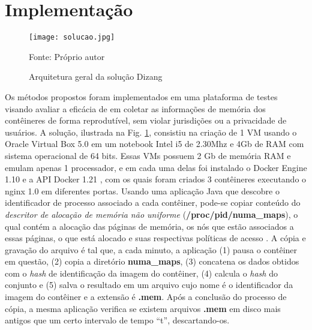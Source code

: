 \section{Implementação}
\label{sec:proposta-impl}


\begin{figure}[htb!]
\footnotesize
\caption{Arquitetura geral da solução Dizang}
\texttt{[image: solucao.jpg]}
\centering
\label{fig:Solucao}
\begin{center}
Fonte: Próprio autor 
\end{center}
\end{figure}


Os métodos propostos foram implementados em uma plataforma de testes visando avaliar a eficácia de \fancyname em coletar as informações de memória dos contêineres de forma reprodutível, sem violar jurisdições ou a privacidade de usuários.
%
A solução, ilustrada na Fig. \ref{fig:Solucao}, consistiu na criação de 1 VM usando o Oracle Virtual Box 5.0%
em um notebook Intel i5 de 2.30Mhz e 4Gb de RAM com sistema operacional de 64 bits.
%
Essas VMs possuem 2 Gb de memória RAM e emulam apenas 1 processador, e em cada uma delas foi instalado o Docker Engine 1.10%
e a API Docker 1.21%
, com os quais foram criados 3 contêineres executando o nginx 1.0%
 em diferentes portas. 
%
Usando uma aplicação Java que descobre o identificador de processo associado a cada contêiner, pode-se copiar conteúdo do \textit{descritor de alocação de memória não uniforme} (\textbf{/proc/pid/numa\_maps}), o qual contém a alocação das páginas de memória, os nós que estão associados a essas páginas, o que está alocado e suas respectivas políticas de acesso \cite{UnixManPagesNumaMaps}.
%
A cópia e gravação do arquivo é tal que, a cada minuto, a aplicação (1) pausa o contêiner em questão, (2) copia a diretório \textbf{numa\_maps}, (3)  concatena os dados obtidos com o \textit{hash} de identificação da imagem do contêiner, (4) calcula o \textit{hash} do conjunto e (5) salva o resultado em um arquivo cujo nome é o identificador da imagem do contêiner e a extensão é \textbf{.mem}. 
%
Após a conclusão do processo de cópia, a mesma aplicação verifica se existem arquivos \textbf{.mem} em disco mais antigos que um certo intervalo de tempo ``t'', descartando-os.
%

